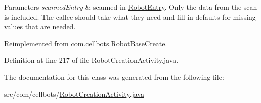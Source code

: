 \begin{DoxyParams}{Parameters}
{\em scanned\-Entry} & scanned in \hyperlink{classcom_1_1cellbots_1_1_robot_entry}{Robot\-Entry}. Only the data from the scan is included. The callee should take what they need and fill in defaults for missing values that are needed. \\
\hline
\end{DoxyParams}


Reimplemented from \hyperlink{classcom_1_1cellbots_1_1_robot_base_create_a517846f7c3a7df6adeadbd5db50ce7cd}{com.\-cellbots.\-Robot\-Base\-Create}.



Definition at line 217 of file Robot\-Creation\-Activity.\-java.



The documentation for this class was generated from the following file\-:\begin{DoxyCompactItemize}
\item 
src/com/cellbots/\hyperlink{_robot_creation_activity_8java}{Robot\-Creation\-Activity.\-java}\end{DoxyCompactItemize}
